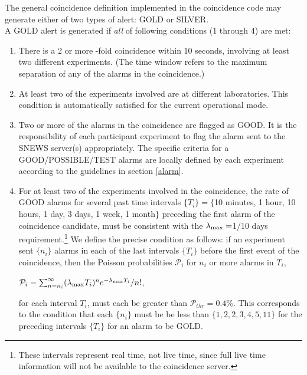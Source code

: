 \documentclass{article}
\begin{document}
The general coincidence definition implemented in the coincidence code
may generate either of two types of alert: GOLD or SILVER.\\
A GOLD alert is generated if {\it all} of
following conditions (1 through 4) are met:

\begin{enumerate}

\item There is a 2 or more -fold coincidence within 10 seconds,
involving at least two different experiments. 
(The time window refers to the maximum
separation of any of the alarms in the coincidence.)

\item At least two of the experiments involved
are at different laboratories.  This condition is automatically
satisfied for the current operational mode.

\item Two or more of the alarms in the coincidence
are flagged as GOOD.  It is the responsibility of each participant
experiment to flag the alarm sent to the SNEWS server(s)
appropriately. The specific criteria for a GOOD/POSSIBLE/TEST alarms
are locally defined by each experiment according to the guidelines 
in section \ref{alarm}.
  
 \item For at least two of the experiments involved in the
 coincidence, the rate of GOOD alarms for several past time intervals
 $\{T_i\}=\{$10 minutes, 1 hour, 10 hours, 1 day, 3 days, 1 week, 1
 month$\}$ preceding the first alarm of the coincidence candidate, 
 must be consistent with the $\lambda_{\rm{max}}=$1/10 days
 requirement.\footnote{These intervals represent real time, not live
 time, since full live time information will not be available to the
 coincidence server.}  We define the precise condition as follows: if
 an experiment sent $\{n_i\}$ alarms in each of the last intervals
 $\{T_i\}$ before the first event of the coincidence, then the Poisson probabilities $\mathcal{P}_i$ for $n_i$
 or more alarms in $T_i$,

$\mathcal{P}_i=\sum_{n=n_i}^{\infty}(\lambda_{\rm{max}} T_i)^{n}e^{-\lambda_{\rm{max}} T_i}/n!$,

for each interval $T_i$, must each be greater than $\mathcal{P}_{thr}=0.4$\%.
This corresponds to the condition that each $\{n_i\}$ must be be less
than $\{1,2,2,3,4,5,11\}$ for the preceding intervals $\{T_i\}$ for an
alarm to be GOLD.

\end{enumerate}
\end{document}

